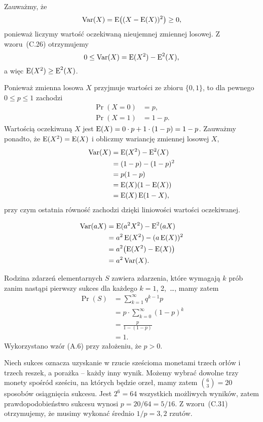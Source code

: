 \exercise{} %
Zauważmy, że
\[
	\operatorname{Var}(X) = \operatorname{E}\bigl((X-\operatorname{E}(X))^2\bigr) \ge 0,
\]
ponieważ liczymy wartość oczekiwaną nieujemnej zmiennej losowej. Z wzoru~(C.26) otrzymujemy
\[
	0 \le \operatorname{Var}(X) = \operatorname{E}(X^2)-\operatorname{E}^2(X),
\]
a więc $\operatorname{E}(X^2)\ge\operatorname{E}^2(X)$.

\exercise{} %
Ponieważ zmienna losowa $X$ przyjmuje wartości ze zbioru $\{0,1\}$, to dla pewnego $0\le p\le1$ zachodzi
\begin{align*}
	\Pr(X=0) &= p, \\
	\Pr(X=1) &= 1-p.
\end{align*}
Wartością oczekiwaną $X$ jest $\operatorname{E}(X)=0\cdot p+1\cdot(1-p)=1-p$. Zauważmy ponadto, że $\operatorname{E}(X^2)=\operatorname{E}(X)$ i obliczmy wariancję zmiennej losowej $X$,
\begin{align*}
	\operatorname{Var}(X) &= \operatorname{E}(X^2)-\operatorname{E}^2(X) \\
	&= (1-p)-(1-p)^2 \\
	&= p(1-p) \\
	&= \operatorname{E}(X)(1-\operatorname{E}(X)) \\
	&= \operatorname{E}(X)\operatorname{E}(1-X),
\end{align*}
przy czym ostatnia równość zachodzi dzięki liniowości wartości oczekiwanej.

\exercise{} %
\begin{align*}
	\operatorname{Var}(aX) &= \operatorname{E}(a^2X^2)-\operatorname{E}^2(aX) \\
	&= a^2\operatorname{E}(X^2)-(a\operatorname{E}(X))^2 \\
	&= a^2\bigl(\operatorname{E}(X^2)-\operatorname{E}(X)\bigr) \\
	&= a^2\operatorname{Var}(X).
\end{align*}

\exercise{} %
Rodzina zdarzeń elementarnych $S$ zawiera zdarzenia, które wymagają $k$ prób zanim nastąpi pierwszy sukces dla każdego $k=1$, 2,~\dots, mamy zatem
\begin{align*}
	\Pr(S) &= \sum_{k=1}^\infty q^{k-1}p \\
	&= p\cdot\sum_{k=0}^\infty (1-p)^k \\
	&= \frac{p}{1-(1-p)} \\[1mm]
	&= 1.
\end{align*}
Wykorzystano wzór (A.6) przy założeniu, że $p>0$.

\exercise{} %
Niech sukces oznacza uzyskanie w rzucie sześcioma monetami trzech orłów i trzech reszek, a porażka -- każdy inny wynik. Możemy wybrać dowolne trzy monety spośród sześciu, na których będzie orzeł, mamy zatem $\binom{6}{3}=20$ sposobów osiągnięcia sukcesu. Jest $2^6=64$ wszystkich możliwych wyników, zatem prawdopodobieństwo sukcesu wynosi $p=20/64=5/16$. Z wzoru~(C.31) otrzymujemy, że musimy wykonać średnio $1/p=3{,}2$ rzutów.

